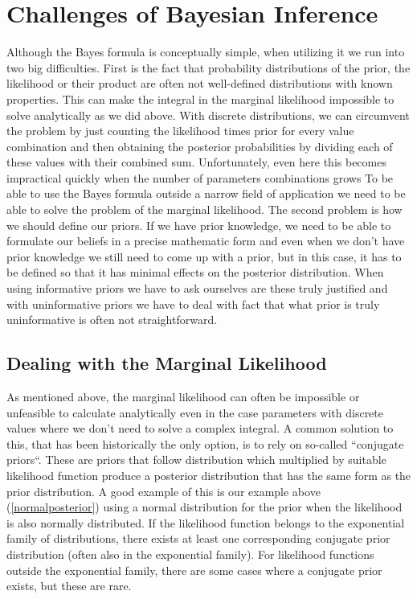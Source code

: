 \documentclass[12pt,a4paper,leqno]{report}
\theoremstyle{plain}
\theoremstyle{definition}
\theoremstyle{remark}
\begin{document}
\section{Challenges of Bayesian Inference}\label{bayesinferencechallenges}

Although the Bayes formula is conceptually simple, when utilizing
it we run into two big difficulties. First is the fact that
probability distributions of the prior, the likelihood or their product
are often not well-defined distributions with known properties. This can make the
integral in the marginal likelihood impossible to solve analytically as we did
above. With discrete distributions, we can circumvent the problem by just counting the
likelihood times prior for every value combination and then obtaining the posterior
probabilities by dividing each of these values with their combined sum. Unfortunately,
even here this becomes impractical quickly when the number of parameters combinations grows
To be able to use the Bayes formula outside a narrow field of application we need to be able to solve the
problem of the marginal likelihood. The second problem is how we should define our priors.
If we have prior knowledge, we need to be able to
formulate our beliefs in a precise mathematic form and even when we don't have prior knowledge we still
need to come up with a prior, but in this case, it has to be defined so that it has
minimal effects on the posterior distribution. When using informative priors we have to
ask ourselves are these truly justified and with uninformative priors we have to deal
with fact that what prior is truly uninformative is often not straightforward.

\subsection{Dealing with the Marginal Likelihood}\label{marginallikehoodproblems}

As mentioned above, the marginal likelihood can often be impossible or
unfeasible to calculate analytically even in the case parameters with discrete
values where we don't need to solve a complex integral. A common solution to this,
that has been historically the only option, is to rely on so-called ``conjugate
priors``. These are priors that follow distribution which multiplied by
suitable likelihood function produce a posterior distribution that has the same
form as the prior distribution. A good example of this is our example above (\ref{normalposterior}) using a normal
distribution for the prior when the likelihood is also normally distributed. If
the likelihood function belongs to the exponential family of distributions, there
exists at least one corresponding conjugate prior distribution (often also in
the exponential family). For likelihood functions outside the exponential family,
there are some cases where a conjugate prior exists, but these are rare.
\end{document}

